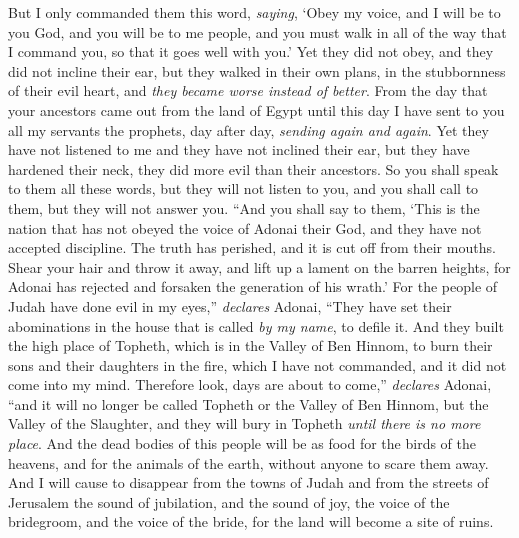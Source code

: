 \begin{biblechapter}
\verse But I only commanded them this word, \textit{saying}, ‘Obey my voice, and I will be to you God, and you will be to me people, and you must walk in all of the way that I command you, so that it goes well with you.’
\verse Yet they did not obey, and they did not incline their ear, but they walked in their own plans, in the stubbornness of their evil heart, and \textit{they became worse instead of better}.
\verse From the day that your ancestors came out from the land of Egypt until this day I have sent to you all my servants the prophets, day after day, \textit{sending again and again}.
\verse Yet they have not listened to me and they have not inclined their ear, but they have hardened their neck, they did more evil than their ancestors.
\verse So you shall speak to them all these words, but they will not listen to you, and you shall call to them, but they will not answer you.
 “And you shall say to them, ‘This is the nation that has not obeyed the voice of Adonai their God, and they have not accepted discipline. The truth has perished, and it is cut off from their mouths.
\verse Shear your hair and throw it away, and lift up a lament on the barren heights, for Adonai has rejected and forsaken the generation of his wrath.’
\verse For the people  of Judah have done evil in my eyes,” \textit{declares} Adonai, “They have set their abominations in the house that is called \textit{by my name}, to defile it.
\verse And they built the high place of Topheth, which is in the Valley of Ben Hinnom, to burn their sons and their daughters in the fire, which I have not commanded, and it did not come into my mind.
\verse Therefore look, days are about to come,” \textit{declares} Adonai, “and it will no longer be called Topheth or the Valley of Ben Hinnom, but the Valley of the Slaughter, and they will bury in Topheth \textit{until there is no more place}.
\verse And the dead bodies of this people will be as food for the birds of the heavens, and for the animals of the earth, without anyone to scare them away.
\verse And I will cause to disappear from the towns of Judah and from the streets of Jerusalem the sound of jubilation, and the sound of joy, the voice of the bridegroom, and the voice of the bride, for the land will become a site of ruins.
\end{biblechapter}

